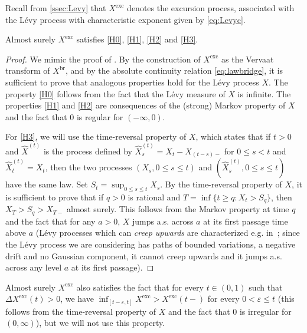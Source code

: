 \documentclass[10pt]{amsart}
\theoremstyle{definition}\newtheorem{defi}[theo]{Definition}\newtheorem{rema}[theo]{Remark}\newtheorem{exam}[theo]{Example}\newtheorem{exem}[theo]{Example}\newtheorem{nota}[theo]{Notation}
\def \Xexc{X^{\mathrm{exc}}}
\def \Xbr{X^{\mathrm{br}}}
\begin{document}
Recall from \cref{ssec:Levy} that $\Xexc$ denotes the excursion process,
associated with the L\'evy process with characteristic exponent given by \eqref{eq:Levyc}.
\begin{lemma}Almost surely $\Xexc$  satisfies \ref{H0}, \ref{H1}, \ref{H2} and \ref{H3}.
  \label{lem:hypoX}
\end{lemma}

\begin{proof}
We mimic the proof of \cite[Proposition 2.10]{Kor14}.
By the construction of $\Xexc$ as the Vervaat transform of $\Xbr$, and by the absolute continuity relation \eqref{eq:lawbridge}, it is sufficient to prove that analogous properties hold
for the L\'evy process $X$.  The property \ref{H0} follows from the fact that the L\'evy measure of $X$ is infinite. The properties \ref{H1} and \ref{H2} are consequences
of the (strong) Markov property of $X$ and the fact that $0$ is regular for $(-\infty,0)$.

For \ref{H3}, we will use the time-reversal property of $X$, which
states that if $t > 0$ and $\widehat{X}^{(t)}$ is the process defined by $\widehat{X}^{(t)}_{s}=X_{t}-X_{(t-s)-}$ for $0 \leq s<t$ and $\widehat{X}^{(t)}_{t}=X_{t}$, then the two processes $(X_{s},0 \leq s \leq t)$ and $(\widehat{X}^{(t)}_{s},0 \leq s \leq t)$ have the same law.
Set $S_{t}= \sup_{0 \leq s \leq t} X_{s}$. By the time-reversal property of $X$,
it is sufficient to prove that if $q > 0$ is rational and $T = \inf\{t  \geq  q : X_{t} > S_{q}\}$, then
$X_{T} > S_{q}  > X_{T-}$ almost surely. This follows from the Markov property at time $q$
and the fact that for any $a > 0$, $X$ jumps a.s. across $a$ at its first passage time
above $a$ (L\'evy processes which can {\em creep upwards}
are characterized e.g. in~\cite[Theorem 7.11]{Kyp06};
since the L\'evy process we are considering has paths of bounded variations,
a negative drift and no Gaussian component, it cannot creep upwards
and it jumps a.s. across any level $a$ at its first passage).
\end{proof}

\begin{remark}
Almost surely $\Xexc$ also satisfies the fact that for every $t \in (0,1)$ such that $\Delta \Xexc(t) > 0$, we have $\inf_{[t-\varepsilon, t]} \Xexc > \Xexc(t-)$ for every $0 < \varepsilon \le t$ (this follows from the time-reversal property of $X$ and the fact that $0$ is irregular for $(0,\infty)$), but we will not use this property.
\end{remark}
\end{document}
